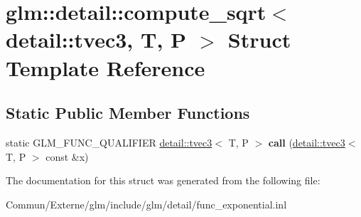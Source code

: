 \hypertarget{structglm_1_1detail_1_1compute__sqrt_3_01detail_1_1tvec3_00_01_t_00_01_p_01_4}{}\section{glm\+:\+:detail\+:\+:compute\+\_\+sqrt$<$ detail\+:\+:tvec3, T, P $>$ Struct Template Reference}
\label{structglm_1_1detail_1_1compute__sqrt_3_01detail_1_1tvec3_00_01_t_00_01_p_01_4}
\subsection*{Static Public Member Functions}
\begin{DoxyCompactItemize}
\item 
static G\+L\+M\+\_\+\+F\+U\+N\+C\+\_\+\+Q\+U\+A\+L\+I\+F\+I\+ER \hyperlink{structglm_1_1detail_1_1tvec3}{detail\+::tvec3}$<$ T, P $>$ {\bfseries call} (\hyperlink{structglm_1_1detail_1_1tvec3}{detail\+::tvec3}$<$ T, P $>$ const \&x)\hypertarget{structglm_1_1detail_1_1compute__sqrt_3_01detail_1_1tvec3_00_01_t_00_01_p_01_4_a18a51ad87ca9848b797060c14651dafe}{}\label{structglm_1_1detail_1_1compute__sqrt_3_01detail_1_1tvec3_00_01_t_00_01_p_01_4_a18a51ad87ca9848b797060c14651dafe}

\end{DoxyCompactItemize}


The documentation for this struct was generated from the following file\+:\begin{DoxyCompactItemize}
\item 
Commun/\+Externe/glm/include/glm/detail/func\+\_\+exponential.\+inl\end{DoxyCompactItemize}
